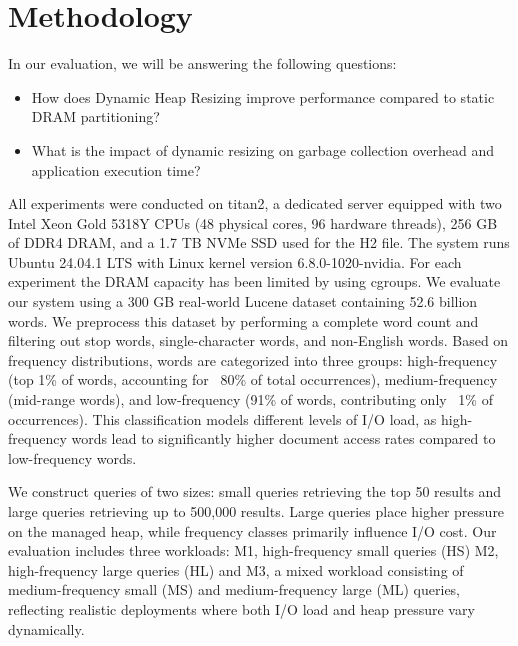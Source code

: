 \section{Methodology}
In our evaluation, we will be answering the following questions:

\begin{itemize}
\item How does Dynamic Heap Resizing improve performance compared to static DRAM partitioning?
\item What is the impact of dynamic resizing on garbage collection overhead and application execution time?
\end{itemize}

All experiments were conducted on titan2, a dedicated server equipped with two
Intel Xeon Gold 5318Y CPUs (48 physical cores, 96 hardware threads), 256 GB of
DDR4 DRAM, and a 1.7 TB NVMe SSD used for the H2 file. The system runs Ubuntu
24.04.1 LTS with Linux kernel version 6.8.0-1020-nvidia. For each experiment the
DRAM capacity has been limited by using cgroups. We evaluate our system using a
300 GB real-world Lucene dataset containing 52.6 billion words. We preprocess
this dataset by performing a complete word count and filtering out stop words,
single-character words, and non-English words. Based on frequency distributions,
words are categorized into three groups: high-frequency (top 1\% of words,
accounting for ~80\% of total occurrences), medium-frequency (mid-range words),
and low-frequency (91\% of words, contributing only ~1\% of occurrences). This
classification models different levels of I/O load, as high-frequency words lead
to significantly higher document access rates compared to low-frequency words.

We construct queries of two sizes: small queries retrieving the top 50 results
and large queries retrieving up to 500,000 results. Large queries place higher
pressure on the managed heap, while frequency classes primarily influence I/O
cost. Our evaluation includes three workloads:
M1, high-frequency small queries (HS)
M2, high-frequency large queries (HL) and
M3, a mixed workload consisting of medium-frequency small (MS) and
medium-frequency large (ML) queries, reflecting realistic deployments where both
I/O load and heap pressure vary dynamically.

